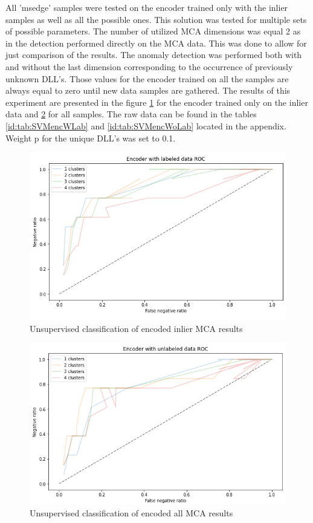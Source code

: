 \documentclass[a4paper,twoside,12pt]{book}
\begin{document}
All 'msedge' samples were tested on the encoder trained only with the inlier samples as well
as all the possible ones.
This solution was tested for multiple sets of possible parameters. The number of utilized MCA 
dimensions was equal 2 as in the detection performed directly on the MCA data. This was done to 
allow for just comparison of the results. The anomaly detection was performed
both with and without the last dimension corresponding to the occurrence of previously unknown DLL's. Those
values for the encoder trained on all the samples are always equal to zero until new data samples
are gathered.
The results of this experiment are presented in the figure \ref{fig:EncROCwLab} for 
the encoder trained only on the inlier data and \ref{fig:EncROCwoLab} for all samples. The raw data
can be found in the tables \ref{id:tab:SVMencWLab} and \ref{id:tab:SVMencWoLab} located in the 
appendix. Weight p for the unique DLL's was set to 0.1.

\begin{figure}
	\centering
	\includegraphics[scale=0.9]{images/EncROCwLabKF.PNG}
	\caption{Unsupervised classification of encoded inlier MCA results}
	\label{fig:EncROCwLab}
 \end{figure}

 \begin{figure}
	\centering
	\includegraphics[scale=0.9]{images/EncROCwoLabKF.PNG}
	\caption{Unsupervised classification of encoded all MCA results}
	\label{fig:EncROCwoLab}
 \end{figure}
\end{document}
